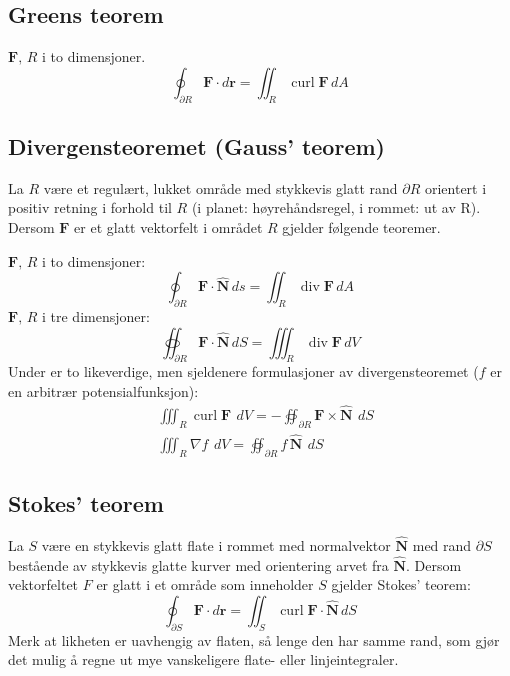 \documentclass[fleqn,12pt]{wlscirep}
\begin{document}
\subsection{Greens teorem}
$\textbf{F},\, R$ i to dimensjoner.
\begin{equation}
    \oint_{\partial R} \textbf{F}\cdot d\textbf{r} = \iint_R \operatorname{curl} \textbf{F} \, dA
\end{equation}
\subsection{Divergensteoremet (Gauss' teorem)}
La $R$ være et regulært, lukket område med stykkevis glatt rand $\partial R$ orientert i positiv retning i forhold til $R$ (i planet: høyrehåndsregel, i rommet: ut av R). Dersom $\textbf{F}$ er et glatt vektorfelt i området $R$ gjelder følgende teoremer.

\noindent $\textbf{F},\,R$ i to dimensjoner:
\begin{equation}
    \oint_{\partial R} \textbf{F} \cdot \hat{\textbf{N}}\, ds = \iint_R \operatorname{div}\textbf{F} \, dA
\end{equation}
$\textbf{F},\, R$ i tre dimensjoner:
\begin{equation}
    \oiint_{\partial R} \textbf{F} \cdot \hat{\textbf{N}}\, dS = \iiint_R \operatorname{div} \textbf{F} \, dV 
\end{equation}
Under er to likeverdige, men sjeldenere formulasjoner av divergensteoremet ($f$ er en arbitrær potensialfunksjon):
\begin{align}
    &\iiint_R \operatorname{curl}\textbf{F} \, \ dV = -\oiint_{\partial R} \textbf{F} \times \hat{\textbf{N}}\,\ dS\\
    &\iiint_R \nabla f\, \ dV = \oiint_{\partial R} f\,\hat{\textbf{N}}\, \ dS
\end{align}
\subsection{Stokes' teorem}
La $S$ være en stykkevis glatt flate i rommet med normalvektor $\hat{\textbf{N}}$ med rand $\partial S$ bestående av stykkevis glatte kurver med orientering arvet fra $\hat{\textbf{N}}$. Dersom vektorfeltet $F$ er glatt i et område som inneholder $S$ gjelder Stokes' teorem:
\begin{equation}
    \oint_{\partial S} \textbf{F} \cdot d\textbf{r} = \iint_S \operatorname{curl} \textbf{F} \cdot \hat{\textbf{N}} \, dS
\end{equation}
Merk at likheten er uavhengig av flaten, så lenge den har samme rand, som gjør det mulig å regne ut mye vanskeligere flate- eller linjeintegraler. 
\end{document}
